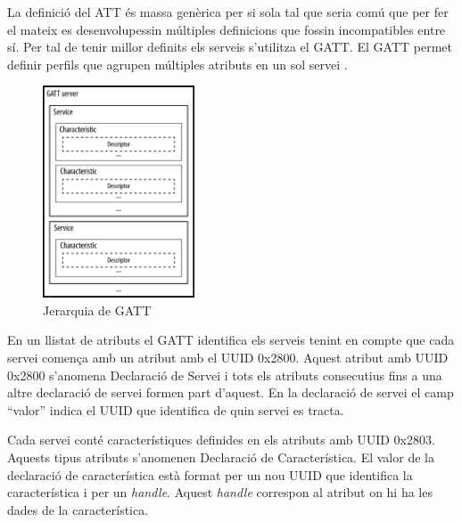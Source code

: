 La definició del ATT és massa genèrica per si sola tal que seria comú que per fer el mateix es desenvolupessin múltiples definicions que fossin incompatibles entre sí.
Per tal de tenir millor definits els serveis s'utilitza el GATT.
El GATT permet definir perfils que agrupen múltiples atributs en un sol servei \cite{services}.

\begin{figure}[h!]
	\begin{center}
		\includegraphics[width=0.4\textwidth]{./images/GATT_Hierarchy.png}
		\caption{Jerarquia de GATT \cite{GATT_Hierarchy}}
	\end{center}
\end{figure}

En un llistat de atributs el GATT identifica els serveis tenint en compte que cada servei comença amb un atribut amb el UUID 0x2800.
Aquest atribut amb UUID 0x2800 s'anomena Declaració de Servei i tots els atributs consecutius fins a una altre declaració de servei formen part d'aquest.
En la declaració de servei el camp ``valor'' indica el UUID que identifica de quin servei es tracta.

Cada servei conté característiques \cite{characteristics} definides en els atributs amb UUID 0x2803.
Aquests tipus atributs s'anomenen Declaració de Característica.
El valor de la declaració de característica està format per un nou UUID que identifica la característica i per un \textit{handle}.
Aquest \textit{handle} correspon al atribut on hi ha les dades de la característica.

